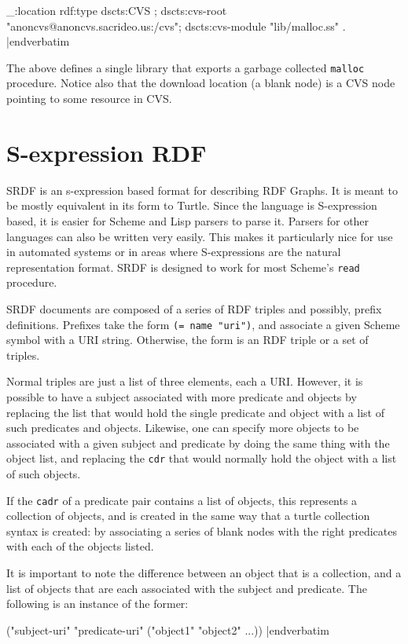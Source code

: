 _:location rdf:type dscts:CVS ;
dscts:cvs-root 
  "anoncvs@anoncvs.sacrideo.us:/cvs";
dscts:cvs-module "lib/malloc.ss" .
|endverbatim

The above defines a single library that exports a garbage 
collected {\tt malloc} procedure. Notice also that the download 
location (a blank node) is a CVS node pointing to some 
resource in CVS. 

\section{S-expression RDF}

SRDF is an s-expression based format for describing RDF Graphs.  It is
meant to be mostly equivalent in its form to Turtle. Since the language
is S-expression based, it is easier for Scheme and Lisp parsers to
parse it. Parsers for other languages can also be written very
easily. This makes it particularly nice for use in automated systems
or in areas where S-expressions are the natural representation format.
SRDF is designed to work for most Scheme's {\tt read} procedure. 

SRDF documents are composed of a series of RDF triples and possibly,
prefix definitions. Prefixes take the form
{\tt (= name "uri")}, and associate a given Scheme
symbol with a URI string. Otherwise, the form is an RDF triple or a set
of triples.

Normal triples are just a list of three elements, each a URI. However,
it is possible to have a subject associated with more predicate
and objects by replacing the list that would hold the single
predicate and object with a list of such predicates and objects.
Likewise, one can specify more objects to be associated with a
given subject and predicate by doing the same thing with the
object list, and replacing the {\tt cdr} that would normally hold the
object with a list of such objects.

If the {\tt cadr} of a predicate pair contains a list of objects, this
represents a collection of objects, and is created in the same
way that a turtle collection syntax is created: by associating
a series of blank nodes with the right predicates with each of
the objects listed.

It is important to note the difference between an object that
is a collection, and a list of objects that are each associated
with the subject and predicate. The following is an instance of
the former:

\medskip\verbatim
("subject-uri" "predicate-uri"
  ("object1" "object2" ...))
|endverbatim
\medskip

